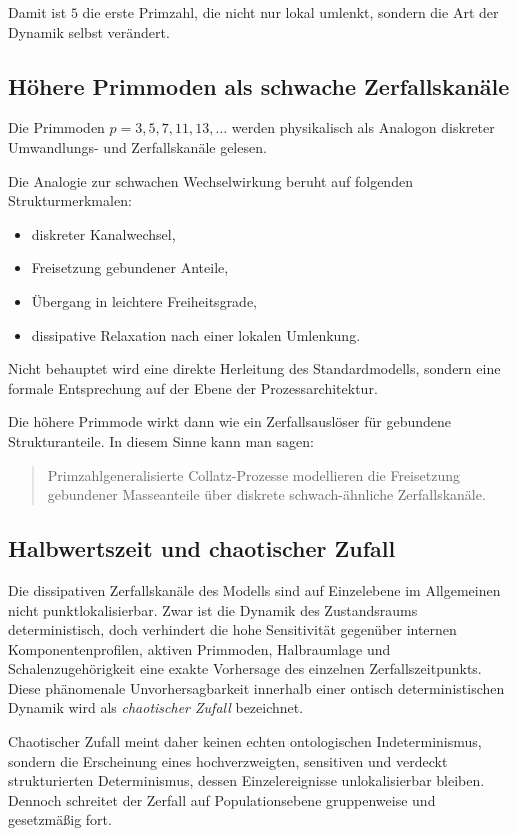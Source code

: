 \documentclass[11pt,a4paper]{article}
\theoremstyle{definition}
\begin{document}
Damit ist $5$ die erste Primzahl, die nicht nur lokal umlenkt, sondern die Art der Dynamik selbst verändert.

\subsection{Höhere Primmoden als schwache Zerfallskanäle}

Die Primmoden $p=3,5,7,11,13,\dots$ werden physikalisch als Analogon diskreter Umwandlungs- und Zerfallskanäle gelesen.

Die Analogie zur schwachen Wechselwirkung beruht auf folgenden Strukturmerkmalen:
\begin{itemize}
	\item diskreter Kanalwechsel,
	\item Freisetzung gebundener Anteile,
	\item Übergang in leichtere Freiheitsgrade,
	\item dissipative Relaxation nach einer lokalen Umlenkung.
\end{itemize}

Nicht behauptet wird eine direkte Herleitung des Standardmodells, sondern eine formale Entsprechung auf der Ebene der Prozessarchitektur.

Die höhere Primmode wirkt dann wie ein Zerfallsauslöser für gebundene Strukturanteile. In diesem Sinne kann man sagen:
\begin{quote}
	Primzahlgeneralisierte Collatz-Prozesse modellieren die Freisetzung gebundener Masseanteile über diskrete schwach-ähnliche Zerfallskanäle.
\end{quote}

\subsection{Halbwertszeit und chaotischer Zufall}

Die dissipativen Zerfallskanäle des Modells sind auf Einzelebene im Allgemeinen nicht punktlokalisierbar. Zwar ist die Dynamik des Zustandsraums deterministisch, doch verhindert die hohe Sensitivität gegenüber internen Komponentenprofilen, aktiven Primmoden, Halbraumlage und Schalenzugehörigkeit eine exakte Vorhersage des einzelnen Zerfallszeitpunkts. Diese phänomenale Unvorhersagbarkeit innerhalb einer ontisch deterministischen Dynamik wird als \emph{chaotischer Zufall} bezeichnet.

Chaotischer Zufall meint daher keinen echten ontologischen Indeterminismus, sondern die Erscheinung eines hochverzweigten, sensitiven und verdeckt strukturierten Determinismus, dessen Einzelereignisse unlokalisierbar bleiben. Dennoch schreitet der Zerfall auf Populationsebene gruppenweise und gesetzmäßig fort.
\end{document}
